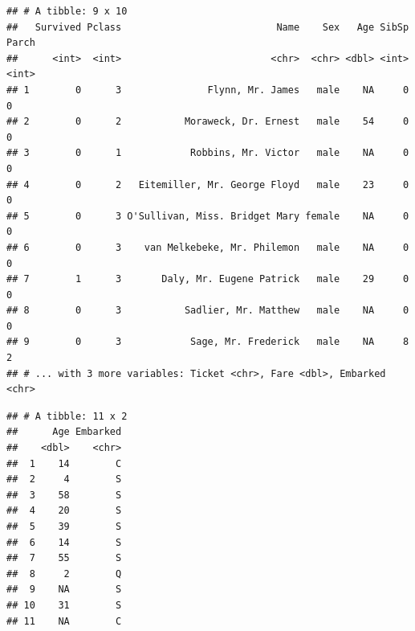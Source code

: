 \documentclass[]{book}
\newenvironment{Shaded}{\begin{snugshade}}{\end{snugshade}}
\newcommand{\KeywordTok}[1]{\textcolor[rgb]{0.13,0.29,0.53}{\textbf{#1}}}
\newcommand{\DecValTok}[1]{\textcolor[rgb]{0.00,0.00,0.81}{#1}}
\newcommand{\StringTok}[1]{\textcolor[rgb]{0.31,0.60,0.02}{#1}}
\newcommand{\CommentTok}[1]{\textcolor[rgb]{0.56,0.35,0.01}{\textit{#1}}}
\newcommand{\OperatorTok}[1]{\textcolor[rgb]{0.81,0.36,0.00}{\textbf{#1}}}
\newcommand{\NormalTok}[1]{#1}
\theoremstyle{definition}
\theoremstyle{definition}
\theoremstyle{definition}
\theoremstyle{remark}
\begin{document}
\begin{verbatim}
## # A tibble: 9 x 10
##   Survived Pclass                           Name    Sex   Age SibSp Parch
##      <int>  <int>                          <chr>  <chr> <dbl> <int> <int>
## 1        0      3               Flynn, Mr. James   male    NA     0     0
## 2        0      2           Moraweck, Dr. Ernest   male    54     0     0
## 3        0      1            Robbins, Mr. Victor   male    NA     0     0
## 4        0      2   Eitemiller, Mr. George Floyd   male    23     0     0
## 5        0      3 O'Sullivan, Miss. Bridget Mary female    NA     0     0
## 6        0      3    van Melkebeke, Mr. Philemon   male    NA     0     0
## 7        1      3       Daly, Mr. Eugene Patrick   male    29     0     0
## 8        0      3           Sadlier, Mr. Matthew   male    NA     0     0
## 9        0      3            Sage, Mr. Frederick   male    NA     8     2
## # ... with 3 more variables: Ticket <chr>, Fare <dbl>, Embarked <chr>
\end{verbatim}

\begin{Shaded}
\end{Shaded}

\begin{verbatim}
## # A tibble: 11 x 2
##      Age Embarked
##    <dbl>    <chr>
##  1    14        C
##  2     4        S
##  3    58        S
##  4    20        S
##  5    39        S
##  6    14        S
##  7    55        S
##  8     2        Q
##  9    NA        S
## 10    31        S
## 11    NA        C
\end{verbatim}

\begin{Shaded}
\end{Shaded}
\end{document}
